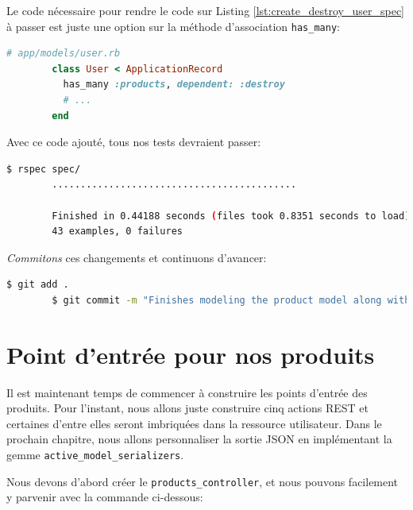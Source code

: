 \documentclass[]{report}
\begin{document}
      Le code nécessaire pour rendre le code sur Listing \ref{lst:create_destroy_user_spec} à passer est juste une option sur la méthode d'association \verb|has_many|:

      \begin{scriptsize}
        \begin{lstlisting}[language=ruby]
        # app/models/user.rb
        class User < ApplicationRecord
          has_many :products, dependent: :destroy
          # ...
        end
        \end{lstlisting}
      \end{scriptsize}

      Avec ce code ajouté, tous nos tests devraient passer:

      \begin{scriptsize}
        \begin{lstlisting}[language=bash]
        $ rspec spec/
        ...........................................

        Finished in 0.44188 seconds (files took 0.8351 seconds to load)
        43 examples, 0 failures
        \end{lstlisting}
      \end{scriptsize}

      \textit{Commitons} ces changements et continuons d'avancer:

      \begin{scriptsize}
        \begin{lstlisting}[language=bash]
        $ git add .
        $ git commit -m "Finishes modeling the product model along with user associations"
        \end{lstlisting}
      \end{scriptsize}

  \section{Point d'entrée pour nos produits}

    Il est maintenant temps de commencer à construire les points d'entrée des produits. Pour l'instant, nous allons juste construire cinq actions REST et certaines d'entre elles seront imbriquées dans la ressource utilisateur. Dans le prochain chapitre, nous allons personnaliser la sortie JSON en implémentant la gemme \verb|active_model_serializers|.

    Nous devons d'abord créer le \verb|products_controller|, et nous pouvons facilement y parvenir avec la commande ci-dessous:
\end{document}
